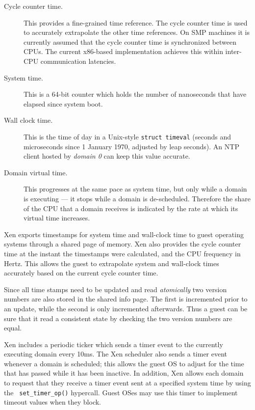 \documentclass[11pt,twoside,final,openright]{report}
\begin{document}
\begin{description}
\item[Cycle counter time.]

This provides a fine-grained time reference.  The cycle counter time is
used to accurately extrapolate the other time references.  On SMP machines
it is currently assumed that the cycle counter time is synchronized between
CPUs.  The current x86-based implementation achieves this within inter-CPU
communication latencies.

\item[System time.]

This is a 64-bit counter which holds the number of nanoseconds that
have elapsed since system boot.


\item[Wall clock time.]

This is the time of day in a Unix-style {\tt struct timeval} (seconds
and microseconds since 1 January 1970, adjusted by leap seconds).  An
NTP client hosted by {\it domain 0} can keep this value accurate.  


\item[Domain virtual time.]

This progresses at the same pace as system time, but only while a
domain is executing --- it stops while a domain is de-scheduled.
Therefore the share of the CPU that a domain receives is indicated by
the rate at which its virtual time increases.

\end{description}


Xen exports timestamps for system time and wall-clock time to guest
operating systems through a shared page of memory.  Xen also provides
the cycle counter time at the instant the timestamps were calculated,
and the CPU frequency in Hertz.  This allows the guest to extrapolate
system and wall-clock times accurately based on the current cycle
counter time.

Since all time stamps need to be updated and read \emph{atomically}
two version numbers are also stored in the shared info page. The 
first is incremented prior to an update, while the second is only
incremented afterwards. Thus a guest can be sure that it read a consistent 
state by checking the two version numbers are equal. 

Xen includes a periodic ticker which sends a timer event to the
currently executing domain every 10ms.  The Xen scheduler also sends a
timer event whenever a domain is scheduled; this allows the guest OS
to adjust for the time that has passed while it has been inactive.  In
addition, Xen allows each domain to request that they receive a timer
event sent at a specified system time by using the {\tt
set\_timer\_op()} hypercall.  Guest OSes may use this timer to
implement timeout values when they block.
\end{document}
